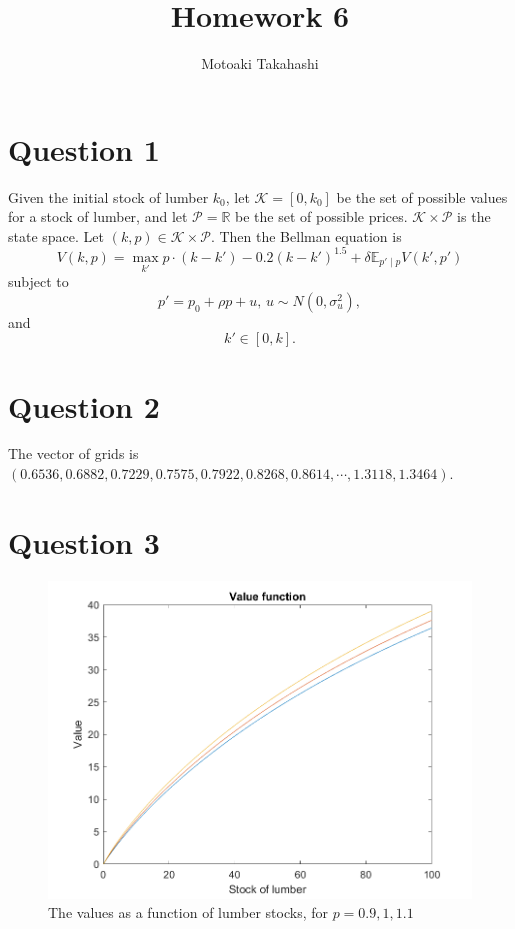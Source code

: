 \documentclass[12pt]{article}
\title{Homework 6}
\author{Motoaki Takahashi}
\date{}
\begin{document}
\maketitle
\section*{Question 1}
Given the initial stock of lumber $k_{0}$, let $\mathcal{K}=[0, k_{0}]$ be the set of possible values for a stock of lumber, and  let $\mathcal{P}=\mathbb{R}$ be the set of possible prices. $\mathcal{K}\times\mathcal{P}$ is the state space. Let $(k, p)\in\mathcal{K}\times\mathcal{P}$. Then the Bellman equation is
\begin{equation}
    V(k, p)=\max_{k'} p\cdot (k-k')-0.2(k-k')^{1.5}+\delta\mathbb{E}_{p'\mid p}V(k', p')
\end{equation}
subject to
$$
p'=p_{0}+\rho p+u,\, u\sim N(0, \sigma_{u}^{2}),
$$
and
$$
k'\in[0, k].
$$
\section*{Question 2}
The vector of grids is $(0.6536,    0.6882,    0.7229,    0.7575,    0.7922,    0.8268,    0.8614, \cdots, 1.3118,    1.3464)$.
\clearpage
\section*{Question 3}
\begin{figure}[h]
\includegraphics[width=\textwidth]{vf.png}
\caption{The values as a function of lumber stocks, for $p=0.9, 1, 1.1$}
\end{figure}
\clearpage
\end{document}
